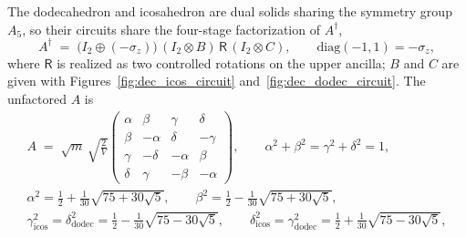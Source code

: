 \documentclass[11pt, oneside, openany]{scrbook}
\newcommand{\sigmaz}{\sigma_z}
\begin{document}
The dodecahedron and icosahedron are dual solids sharing the symmetry group $A_5$, so their circuits share the four-stage factorization of $A^\dagger$,
\begin{equation} \label{eq:adagger}
A^\dagger \;=\; \bigl(I_2 \oplus (-\sigmaz)\bigr)\,(I_2 \otimes B)\,\mathsf{R}\,(I_2 \otimes C), \qquad \mathrm{diag}(-1, 1) = -\sigmaz,
\end{equation}
where $\mathsf{R}$ is realized as two controlled rotations on the upper ancilla; $B$ and $C$ are given with Figures~\ref{fig:dec_icos_circuit} and~\ref{fig:dec_dodec_circuit}. The unfactored $A$ is
\begin{equation} \label{eq:aunfactored}
\begin{gathered} A \;=\; \sqrt{m}\,\sqrt{\tfrac{2}{V}}\begin{pmatrix}\alpha & \beta & \gamma & \delta \\ \beta & -\alpha & \delta & -\gamma \\ \gamma & -\delta & -\alpha & \beta \\ \delta & \gamma & -\beta & -\alpha\end{pmatrix}, \qquad \alpha^2 + \beta^2 = \gamma^2 + \delta^2 = 1, \\[6pt] \alpha^2 = \tfrac{1}{2} + \tfrac{1}{30}\sqrt{75 + 30\sqrt{5}}, \qquad \beta^2 = \tfrac{1}{2} - \tfrac{1}{30}\sqrt{75 + 30\sqrt{5}}, \\[2pt] \gamma_\mathrm{icos}^2 = \delta_\mathrm{dodec}^2 = \tfrac{1}{2} - \tfrac{1}{30}\sqrt{75 - 30\sqrt{5}}, \qquad \delta_\mathrm{icos}^2 = \gamma_\mathrm{dodec}^2 = \tfrac{1}{2} + \tfrac{1}{30}\sqrt{75 - 30\sqrt{5}}, \end{gathered}
\end{equation}
\end{document}
